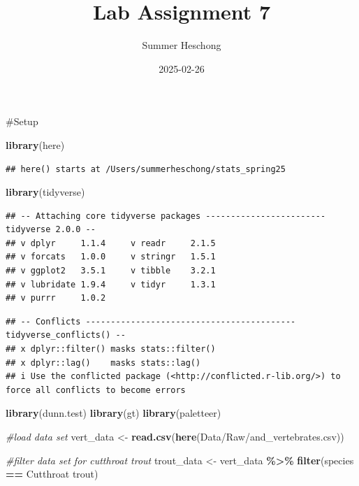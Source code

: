 \documentclass[
]{article}
\title{Lab Assignment 7}
\author{Summer Heschong}
\date{2025-02-26}
\newenvironment{Shaded}{\begin{snugshade}}{\end{snugshade}}
\newcommand{\CommentTok}[1]{\textcolor[rgb]{0.56,0.35,0.01}{\textit{#1}}}
\newcommand{\FunctionTok}[1]{\textcolor[rgb]{0.13,0.29,0.53}{\textbf{#1}}}
\newcommand{\NormalTok}[1]{#1}
\newcommand{\OtherTok}[1]{\textcolor[rgb]{0.56,0.35,0.01}{#1}}
\newcommand{\SpecialCharTok}[1]{\textcolor[rgb]{0.81,0.36,0.00}{\textbf{#1}}}
\newcommand{\StringTok}[1]{\textcolor[rgb]{0.31,0.60,0.02}{#1}}
\begin{document}
\maketitle

\#Setup

\begin{Shaded}
\begin{Highlighting}[]
\FunctionTok{library}\NormalTok{(here)}
\end{Highlighting}
\end{Shaded}

\begin{verbatim}
## here() starts at /Users/summerheschong/stats_spring25
\end{verbatim}

\begin{Shaded}
\begin{Highlighting}[]
\FunctionTok{library}\NormalTok{(tidyverse)}
\end{Highlighting}
\end{Shaded}

\begin{verbatim}
## -- Attaching core tidyverse packages ------------------------ tidyverse 2.0.0 --
## v dplyr     1.1.4     v readr     2.1.5
## v forcats   1.0.0     v stringr   1.5.1
## v ggplot2   3.5.1     v tibble    3.2.1
## v lubridate 1.9.4     v tidyr     1.3.1
## v purrr     1.0.2
\end{verbatim}

\begin{verbatim}
## -- Conflicts ------------------------------------------ tidyverse_conflicts() --
## x dplyr::filter() masks stats::filter()
## x dplyr::lag()    masks stats::lag()
## i Use the conflicted package (<http://conflicted.r-lib.org/>) to force all conflicts to become errors
\end{verbatim}

\begin{Shaded}
\begin{Highlighting}[]
\FunctionTok{library}\NormalTok{(dunn.test)}
\FunctionTok{library}\NormalTok{(gt)}
\FunctionTok{library}\NormalTok{(paletteer)}

\CommentTok{\#load data set}
\NormalTok{vert\_data }\OtherTok{\textless{}{-}} \FunctionTok{read.csv}\NormalTok{(}\FunctionTok{here}\NormalTok{(}\StringTok{\textquotesingle{}Data/Raw/and\_vertebrates.csv\textquotesingle{}}\NormalTok{))}

\CommentTok{\#filter data set for cutthroat trout}
\NormalTok{trout\_data }\OtherTok{\textless{}{-}}\NormalTok{ vert\_data }\SpecialCharTok{\%\textgreater{}\%}
  \FunctionTok{filter}\NormalTok{(species }\SpecialCharTok{==} \StringTok{\textquotesingle{}Cutthroat trout\textquotesingle{}}\NormalTok{)}
\end{Highlighting}
\end{Shaded}
\end{document}
